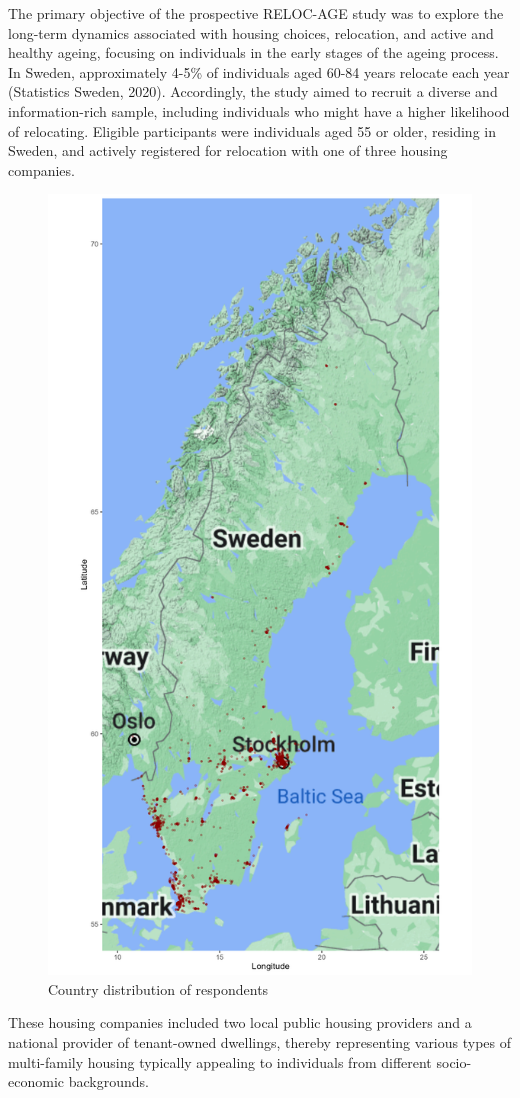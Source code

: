 \documentclass[3p,11pt ]{elsarticle}
\begin{document}
The primary objective of the prospective RELOC-AGE study was to explore the long-term dynamics associated with housing choices, relocation, and active and healthy ageing, focusing on individuals in the early stages of the ageing process.
In Sweden, approximately 4-5\% of individuals aged 60-84 years relocate each year (Statistics Sweden, 2020).
Accordingly, the study aimed to recruit a diverse and information-rich sample, including individuals who might have a higher likelihood of relocating.
Eligible participants were individuals aged 55 or older, residing in Sweden, and actively registered for relocation with one of three housing companies.
\begin{figure}
\centering
\includegraphics[scale=0.25]{figures/survey_location.png}
\caption{Country distribution of respondents \label{fig:map}}
\end{figure}
These housing companies included two local public housing providers and a national provider of tenant-owned dwellings, thereby representing various types of multi-family housing typically appealing to individuals from different socio-economic backgrounds. 
\end{document}
